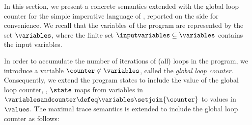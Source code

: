 In this section, we present a concrete semantics extended with the global loop counter for the simple imperative language of , reported on the side for convenience.
We recall that the variables of the program are represented by the set $\variables$, where the finite set $\inputvariables\subseteq\variables$ contains the input variables.




In order to accumulate the number of iterations of (all) loops in the program, we introduce a variable $\counter\not\in\variables$, called the \emph{global loop counter}.
Consequently, we extend the program states to include the value of the global loop counter, \ie, $\state$ maps from variables in $\variablesandcounter\defeq\variables\setjoin\{\counter\}$ to values in $\values$.
The maximal trace semantics is extended to include the global loop counter as follows:

